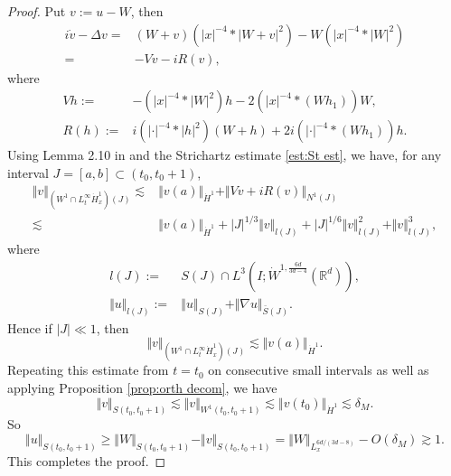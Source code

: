 \documentclass[reqno, 11pt]{amsart}
\numberwithin{equation}{section}
\newcommand{\R}{\mathbb{R}}
\theoremstyle{plain}
\theoremstyle{definition}
\numberwithin{equation}{section}
\numberwithin{theorem}{section}
\numberwithin{equation}{section}
\numberwithin{equation}{section}
\numberwithin{theorem}{section}
\begin{document}
\begin{proof}
		Put $v:=u-W$, then 
		\begin{equation*}
		\begin{aligned}
		i\dot{v}-\Delta v=&(W+v)\left( |x|^{-4}*|W+v|^2 \right)-W\left( |x|^{-4}*|W|^2 \right)\\=&-Vv-iR(v),
		\end{aligned}
		\end{equation*}
		where
		\begin{equation*}
		\begin{aligned}
		Vh:=&-\left( |x|^{-4}*|W|^2 \right)h-2\left( |x|^{-4}*(Wh_1) \right)W,\\R(h):=&i\left( |\cdot|^{-4}*|h|^2 \right)(W+h)
		+2i\left( |\cdot|^{-4}*(Wh_1) \right)h.
		\end{aligned}
		\end{equation*}
		Using Lemma 2.10 in \cite{MWX:Hart} and the Strichartz estimate \eqref{est:St est}, we have, for any interval $J=[a,b]\subset(t_0,t_0 +1)$, 
		\begin{equation*}
		\begin{aligned}
		\Vert v \Vert_{\left( W^1 \cap L_{t}^{\infty}\dot H_x^1 \right)(J)} \lesssim&\Vert v(a)\Vert_{\dot H^1}+\Vert Vv+iR(v) \Vert_{N^1(J)}\\\lesssim&\Vert v(a)\Vert_{\dot H^1}+|J|^{1/3}\Vert v\Vert_{l(J)}+|J|^{1/6}\Vert v\Vert_{l(J)}^2+\Vert v\Vert_{l(J)}^3,
		\end{aligned}
		\end{equation*}
		where 
		\begin{align*}
		l(J):=&S(J)\cap L^{3}\left( I;\dot{W}^{1,\frac{6d}{3d-4}} (\mathbb{R}^d)\right),\\\Vert u\Vert_{l(J)}:=&\Vert u\Vert_{S(J)}+\Vert \nabla u\Vert_{\bar{S}(J)}.
		\end{align*}
		Hence if $|J|\ll 1$, then
		\begin{equation*}
		\Vert v \Vert_{\left( W^1 \cap L_{t}^{\infty}\dot H_x^1 \right)(J)} \lesssim \Vert v(a) \Vert_{\dot H^1}.
		\end{equation*}
		Repeating this estimate from $t=t_0$ on consecutive small intervals as well as applying Proposition \ref{prop:orth decom}, we have
		\begin{equation*}
		\Vert v \Vert_{S(t_0,t_0 +1)} \lesssim \Vert v \Vert_{W^1(t_0,t_0 +1)} \lesssim \Vert v(t_0) \Vert_{\dot H^1}\lesssim \delta_{M}.
		\end{equation*}
		So
		\begin{equation*}
		\Vert u \Vert_{S(t_0,t_0 +1)}\geq\Vert W \Vert_{S(t_0,t_0 +1)}-\Vert v \Vert_{S(t_0,t_0 +1)}= \Vert W \Vert_{L_{x}^{6d/(3d-8)} }-O(\delta_{M}) \gtrsim 1.
		\end{equation*}
		This completes the proof.
	\end{proof}	
	
\end{document}
